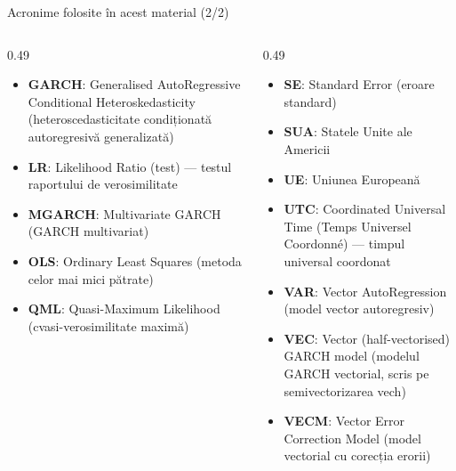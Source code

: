 \begin{frame}{Acronime folosite în acest material (2/2)}
\begin{columns}[T]
\begin{column}{0.49\textwidth}
\begin{itemize}\setlength{\itemsep}{0pt}
    \item \textbf{GARCH}: Generalised AutoRegressive Conditional Heteroskedasticity (heteroscedasticitate condiționată autoregresivă generalizată)
    \item \textbf{LR}: Likelihood Ratio (test) — testul raportului de verosimilitate
    \item \textbf{MGARCH}: Multivariate GARCH (GARCH multivariat)
    \item \textbf{OLS}: Ordinary Least Squares (metoda celor mai mici pătrate)
    \item \textbf{QML}: Quasi-Maximum Likelihood (cvasi-verosimilitate maximă)
\end{itemize}
\end{column}
\begin{column}{0.49\textwidth}
\begin{itemize}\setlength{\itemsep}{0pt}
    \item \textbf{SE}: Standard Error (eroare standard)
    \item \textbf{SUA}: Statele Unite ale Americii
    \item \textbf{UE}: Uniunea Europeană
    \item \textbf{UTC}: Coordinated Universal Time (Temps Universel Coordonné) — timpul universal coordonat
    \item \textbf{VAR}: Vector AutoRegression (model vector autoregresiv)
    \item \textbf{VEC}: Vector (half-vectorised) GARCH model (modelul GARCH vectorial, scris pe semivectorizarea vech)
    \item \textbf{VECM}: Vector Error Correction Model (model vectorial cu corecția erorii)
\end{itemize}
\end{column}
\end{columns}
\end{frame}

